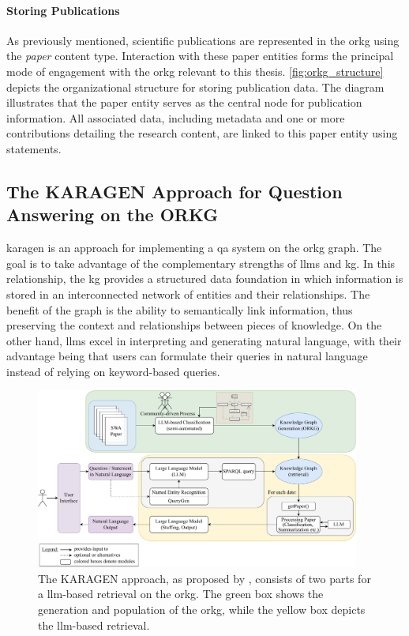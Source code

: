 \paragraph{Storing Publications} As previously mentioned, scientific publications are represented in the \gls{orkg} using the \emph{paper} content type. Interaction with these paper entities forms the principal mode of engagement with the \gls{orkg} relevant to this thesis. \autoref{fig:orkg_structure} depicts the organizational structure for storing publication data. The diagram illustrates that the paper entity serves as the central node for publication information. All associated data, including metadata and one or more contributions detailing the research content, are linked to this paper entity using statements.

\subsection{The KARAGEN Approach for Question Answering on the ORKG}

\gls{karagen} is an approach for implementing a \gls{qa} system on the \gls{orkg} graph. The goal is to take advantage of the complementary strengths of \glspl{llm} and \gls{kg}. In this relationship, the \gls{kg} provides a structured data foundation in which information is stored in an interconnected network of entities and their relationships. The benefit of the graph is the ability to semantically link information, thus preserving the context and relationships between pieces of knowledge. On the other hand, \glspl{llm} excel in interpreting and generating natural language, with their advantage being that users can formulate their queries in natural language instead of relying on keyword-based queries. \cite{kaplan_combining_2024}

\begin{figure}[t]
    \centering
    \includegraphics[width=0.95\textwidth]{figures/karagen.pdf}
    \caption[The KARAGEN Approach]{The KARAGEN approach, as proposed by \textcite{kaplan_combining_2024}, consists of two parts for a \gls{llm}-based retrieval on the \gls{orkg}. The green box shows the generation and population of the \gls{orkg}, while the yellow box depicts the \gls{llm}-based retrieval.}
    \label{fig:karagen}
\end{figure}

